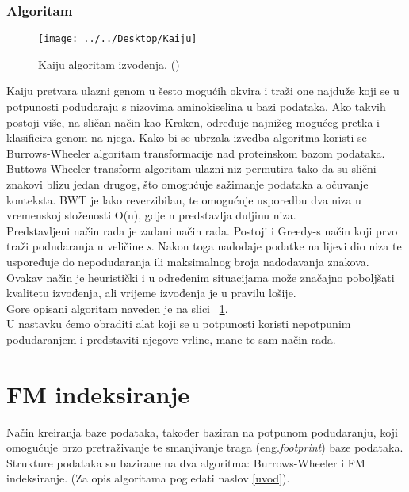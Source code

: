 \documentclass[times, utf8, seminar]{fer}
\begin{document}
\subsection{Algoritam}

\begin{figure}
	\centering
	\texttt{[image: ../../Desktop/Kaiju]}
	\caption{Kaiju algoritam izvođenja. (\cite{Kaiju})}
	\label{fig:kaiju}
\end{figure}
Kaiju pretvara ulazni genom u šesto mogućih okvira i traži one najduže koji se u potpunosti podudaraju s nizovima aminokiselina u bazi podataka.  Ako takvih postoji više, na sličan način kao Kraken, određuje najnižeg mogućeg pretka i klasificira genom na njega. Kako bi se ubrzala izvedba algoritma koristi se Burrows-Wheeler algoritam transformacije nad proteinskom bazom podataka.
\\Buttows-Wheeler transform algoritam ulazni niz permutira tako da su slični znakovi blizu jedan drugog, što omogućuje sažimanje podataka a očuvanje konteksta. BWT je lako reverzibilan, te omogućuje usporedbu dva niza u vremenskoj složenosti O(n), gdje n predstavlja duljinu niza.
\\Predstavljeni način rada je zadani način rada. Postoji i Greedy-s način koji prvo traži podudaranja u veličine \textit{s}. Nakon toga nadodaje podatke na lijevi dio niza te uspoređuje do nepodudaranja ili maksimalnog broja nadodavanja znakova. Ovakav način je heuristički i u određenim situacijama može značajno poboljšati kvalitetu izvođenja, ali vrijeme izvođenja je u pravilu lošije.
\\Gore opisani algoritam naveden je na slici ~\ref{fig:kaiju}.
\\U nastavku ćemo obraditi alat koji se u potpunosti koristi nepotpunim podudaranjem i predstaviti njegove vrline, mane te sam način rada.
\chapter{FM indeksiranje}
Način kreiranja baze podataka, također baziran na potpunom podudaranju, koji omogućuje brzo pretraživanje te smanjivanje traga (eng.\textit{footprint}) baze podataka. Strukture podataka su bazirane na dva algoritma: Burrows-Wheeler i FM indeksiranje. (Za opis algoritama pogledati naslov \ref{uvod}).
\end{document}

